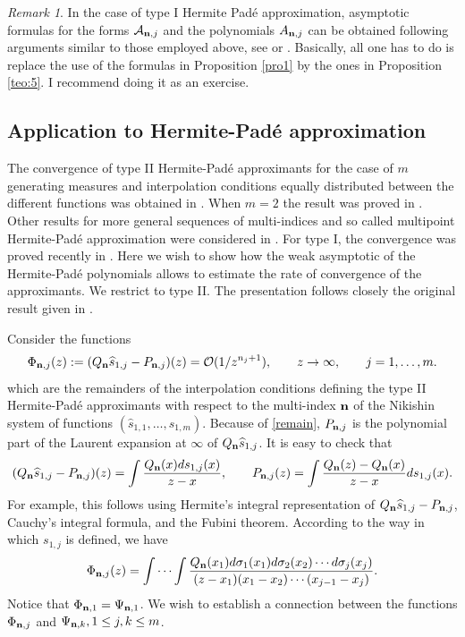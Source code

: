 \documentclass{amsart}
\theoremstyle{definition}
\theoremstyle{remark}
\newtheorem{rem}[teo]{\sc Remark}
\begin{document}
\begin{rem} In the case of type I Hermite Pad\'e approximation, asymptotic formulas for the forms $\mathcal{A}_{{\bf n},j}$ and the polynomials $A_{{\bf n},j}$  can be obtained following  arguments similar to those employed above, see \cite{nik2} or \cite{NiSo}. Basically, all one has to do is replace the use of the formulas in Proposition \ref{pro1} by the ones in Proposition \ref{teo:5}. I recommend doing it as an exercise.
\end{rem}

\subsection{Application to Hermite-Pad\'e approximation}

The convergence of type II Hermite-Pad\'e approximants for the case of $m$ generating measures and interpolation conditions equally distributed between the different functions was obtained in \cite{Bus}. When $m=2$ the result was proved in \cite{Nik}. Other results for more general sequences of multi-indices and so called multipoint Hermite-Pad\'e approximation were considered in \cite{LF2, LF3}. For type I, the convergence was proved recently in \cite{LS}. Here we wish to show how the weak  asymptotic of the Hermite-Pad\'e polynomials allows to estimate the rate of convergence of the approximants. We restrict  to type II. The presentation follows closely the original result given in \cite{GRS}.

Consider the functions
\begin{equation}\label{remain} \Phi_{{\bf n},j}(z) := (Q_{\bf n} \widehat{s}_{1,j} - P_{{\bf n},j})(z) = \mathcal{O}(1/z^{n_j +1}), \qquad z \to \infty, \qquad j=1,\ldots,m.
\end{equation}
which are the remainders of the interpolation conditions defining the type II Hermite-Pad\'e approximants with respect to the multi-index $\bf n$ of the Nikishin system of functions $(\widehat{s}_{1,1},\ldots,\widehat{s}_{1,m})$.
Because of \eqref{remain}, $P_{{\bf n},j}$ is the polynomial part of the Laurent expansion at $\infty$ of $Q_{\bf n} \widehat{s}_{1,j}$. It is easy to check that
\[(Q_{\bf n} \widehat{s}_{1,j} - P_{{\bf n},j})(z) =  \int \frac{Q_{\bf n}(x) ds_{1,j}(x)}{z-x}, \qquad  P_{{\bf n},j}(z) = \int \frac{Q_{\bf n}(z) - Q_{\bf n}(x)}{z-x} d s_{1,j}(x).
\]
For example, this follows using Hermite's integral representation of $Q_{\bf n} \widehat{s}_{1,j} - P_{{\bf n},j}$, Cauchy's integral formula, and the Fubini theorem. According to the way in which $s_{1,j}$ is defined, we have
\[ \Phi_{{\bf n},j}(z) = \int \cdots \int  \frac{Q_{\bf n}(x_1) d\sigma_1(x_1)d\sigma_2(x_2)\cdots d\sigma_j(x_j)}{(z- x_1)(x_1-x_2)\cdots(x_{j-1} - x_{j})}.
\]
Notice that $\Phi_{{\bf n},1} = \Psi_{{\bf n},1}$. We wish to establish a connection between the functions $\Phi_{{\bf n},j}$ and $\Psi_{{\bf n},k}, 1\leq j,k \leq m$.
\end{document}
